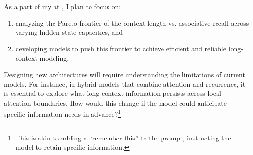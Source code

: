 As a part of my \thedegree at \thecollegeabbr, I plan to focus on:
\begin{enumerate}[itemsep=0pt, topsep=0pt]
    \item analyzing the Pareto frontier of the context length vs. associative recall across varying hidden-state capacities, and
    
    \item developing models to push this frontier to achieve efficient and reliable long-context modeling.
\end{enumerate}
Designing new architectures will require understanding the limitations of current models. For instance, in hybrid models that combine attention and recurrence, it is essential to explore what long-context information persists across local attention boundaries. How would this change if the model could anticipate specific information needs in advance?\footnote{This is akin to adding a ``remember this'' to the prompt, instructing the model to retain specific information.}

\par